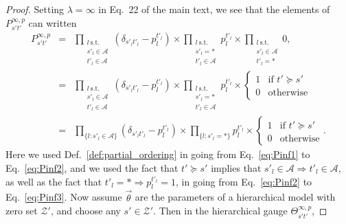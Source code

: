 \documentclass{article}
\numberwithin{myclaim}{section}
\begin{document}
\begin{proof}
Setting $\lambda=\infty$ in Eq.\ 22 of the main text, we see that the elements of $P_{s't'}^{\infty,p}$ can written
\begin{eqnarray}
    P^{\infty,p}_{s' t'}\!\!\!\!
    &=&\!\!\!\!
    \prod_{\substack{l\ \textrm{s.t.}\ \\ s'_l \in \mathcal{A} \\ t'_l \in \mathcal{A} } }\!\! \left(\delta_{s'_l t'_l} - p^{t'_l}_l \right) 
    \times \!\!
    \prod_{\substack{l\ \textrm{s.t.}\ \\  s'_l = * \\ t'_l\in \mathcal{A} } }\!\! p^{t'_l}_l 
    \times \!\!
    \prod_{\substack{l\ \textrm{s.t.}\ \\ s'_l\in \mathcal{A} \\ t'_l = * } }\!\! 0, \label{eq:Pinf1} \\
    &=& \!\!\!\!
    \prod_{\substack{l\ \textrm{s.t.}\ \\ s'_l \in \mathcal{A} \\ t'_l \in \mathcal{A} } }\!\! \left(\delta_{s'_l t'_l} - p^{t'_l}_l \right) 
    \times \!\!
    \prod_{\substack{l\ \textrm{s.t.}\ \\  s'_l = * \\ t'_l\in \mathcal{A} } }\!\! p^{t'_l}_l 
    \times 
    \left\{ 
    \begin{array}{rl} 
        1 & \textrm{if } t' \succeq s' \\
        0 & \textrm{otherwise}
    \end{array} 
    \right. \label{eq:Pinf2} \\
    &=& \!\!\!\!
    \prod_{\{l:s'_l \in \mathcal{A} \}}\!\! \left(\delta_{s'_l t'_l} - p^{t'_l}_l \right) 
    \times \!\!
    \prod_{\{l: s'_l = *\}}\!\! p^{t'_l}_l 
    \times 
    \left\{ 
    \begin{array}{rl} 
        1 & \textrm{if } t' \succeq s' \\
        0 & \textrm{otherwise}
    \end{array} 
    \right. \label{eq:Pinf3} .
\end{eqnarray}
Here we used Def.\ \ref{def:partial_ordering} in going from Eq.\ \ref{eq:Pinf1} to Eq.\ \ref{eq:Pinf2}, and we used the fact that $t' \succeq s'$ implies that $s'_l \in \mathcal{A} \Rightarrow t'_l \in \mathcal{A}$, as well as the fact that $t'_l=* \Rightarrow p_l^{t'_l} = 1$, in going from Eq.\ \ref{eq:Pinf2} to Eq.\ \ref{eq:Pinf3}. Now assume $\vec{\theta}$ are the parameters of a hierarchical model with zero set $\mathcal{Z}'$, and choose any $s' \in \mathcal{Z}'$. Then in the hierarchical gauge $\Theta^{\infty,p}_{s' t'}$, 

\end{proof}
\end{document}
